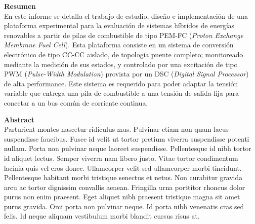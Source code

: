 \Huge
\textbf{Resumen}\\

\normalsize
En este informe se detalla el trabajo de estudio, diseño e implementación de una plataforma experimental para la evaluación de sistemas híbridos de energías renovables a partir de pilas de combustible de tipo PEM-FC (\textit{Proton Exchange Membrane Fuel Cell}). Esta plataforma consiste en un sistema de conversión electrónico de tipo CC-CC aislado, de topología puente completo; monitoreado mediante la medición de sus estados, y controlado por una excitación de tipo PWM (\textit{Pulse-Width Modulation}) provista por un DSC (\textit{Digital Signal Processor}) de alta performance. Este sistema es requerido para poder adaptar la tensión variable que entrega una pila de combustible a una tensión de salida fija para conectar a un bus común de corriente continua. 



\vspace{1cm}
\Huge
\textbf{Abstract}\\

\normalsize
Parturient montes nascetur ridiculus mus. Pulvinar etiam non quam lacus suspendisse faucibus. Fusce id velit ut tortor pretium viverra suspendisse potenti nullam. Porta non pulvinar neque laoreet suspendisse. Pellentesque id nibh tortor id aliquet lectus. Semper viverra nam libero justo. Vitae tortor condimentum lacinia quis vel eros donec. Ullamcorper velit sed ullamcorper morbi tincidunt. Pellentesque habitant morbi tristique senectus et netus. Non curabitur gravida arcu ac tortor dignissim convallis aenean. Fringilla urna porttitor rhoncus dolor purus non enim praesent. Eget aliquet nibh praesent tristique magna sit amet purus gravida. Orci porta non pulvinar neque. Id porta nibh venenatis cras sed felis. Id neque aliquam vestibulum morbi blandit cursus risus at.\\